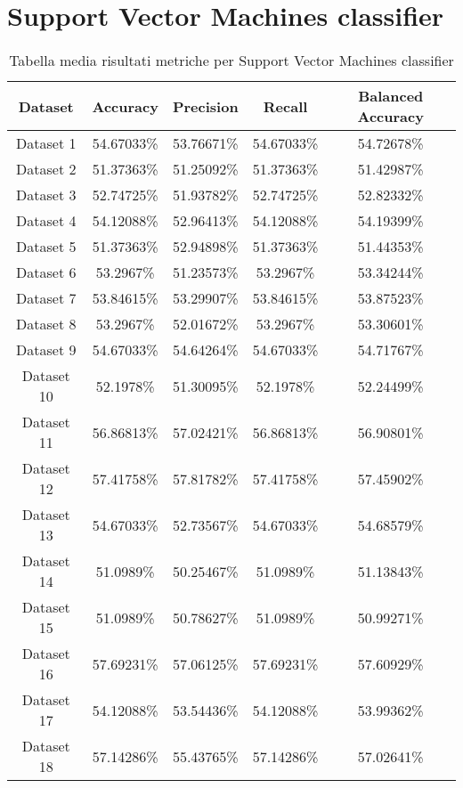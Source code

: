 \section{Support Vector Machines classifier}
\begin{table}
\centering
\caption{Tabella media risultati metriche per Support Vector Machines classifier}
\label{tab:6}
\begin{tabular}{ |c||c|c|c|c| } 
    \hline
    Dataset & Accuracy & Precision & Recall & Balanced Accuracy\\ 
    \hline\hline
    Dataset 1& 54.67033\%& 53.76671\%& 54.67033\%& 54.72678\%\\
    \hline
    Dataset 2& 51.37363\%& 51.25092\%& 51.37363\%& 51.42987\%\\
    \hline
    Dataset 3& 52.74725\%& 51.93782\%& 52.74725\%& 52.82332\%\\
    \hline
    Dataset 4& 54.12088\%& 52.96413\%& 54.12088\%& 54.19399\%\\
    \hline
    Dataset 5& 51.37363\%& 52.94898\%& 51.37363\%& 51.44353\%\\
    \hline
    Dataset 6& 53.2967\%& 51.23573\%& 53.2967\%& 53.34244\%\\
    \hline
    Dataset 7& 53.84615\%& 53.29907\%& 53.84615\%& 53.87523\%\\
    \hline
    Dataset 8& 53.2967\%& 52.01672\%& 53.2967\%& 53.30601\%\\
    \hline
    Dataset 9& 54.67033\%& 54.64264\%& 54.67033\%& 54.71767\%\\
    \hline
    Dataset 10& 52.1978\%& 51.30095\%& 52.1978\%& 52.24499\%\\
    \hline
    Dataset 11& 56.86813\%& 57.02421\%& 56.86813\%& 56.90801\%\\
    \hline
    Dataset 12& 57.41758\%& 57.81782\%& 57.41758\%& 57.45902\%\\
    \hline
    Dataset 13& 54.67033\%& 52.73567\%& 54.67033\%& 54.68579\%\\
    \hline
    Dataset 14& 51.0989\%& 50.25467\%& 51.0989\%& 51.13843\%\\
    \hline
    Dataset 15& 51.0989\%& 50.78627\%& 51.0989\%& 50.99271\%\\
    \hline
    Dataset 16& 57.69231\%& 57.06125\%& 57.69231\%& 57.60929\%\\
    \hline
    Dataset 17& 54.12088\%& 53.54436\%& 54.12088\%& 53.99362\%\\
    \hline
    Dataset 18& 57.14286\%& 55.43765\%& 57.14286\%& 57.02641\%\\

\end{tabular}
\end{table}
